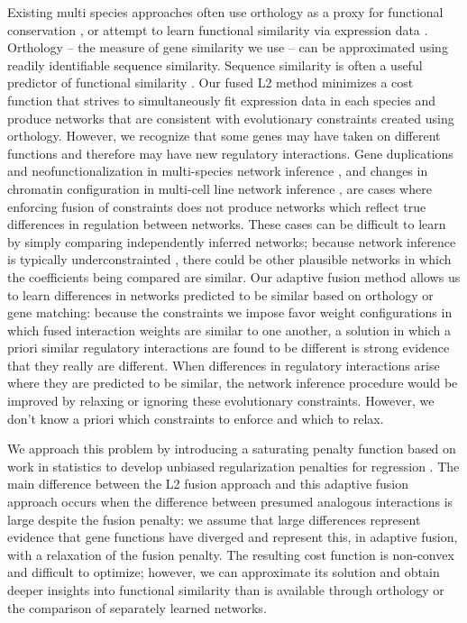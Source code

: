 \documentclass[11pt]{article}
\begin{document}
Existing multi species approaches often use orthology as a proxy for functional conservation \cite{penfold_inferring_2015, joshi_multi-species_2015, kashima_simultaneous_2009, zhang2010nearly}, or attempt to learn functional similarity via expression data \cite{gholami_cross-species_2010}. Orthology -- the measure of gene similarity we use -- can be approximated using readily identifiable sequence similarity. Sequence similarity is often a useful predictor of functional similarity \cite{wilson_assessing_2000}. Our fused L2 method minimizes a cost function that strives to simultaneously fit expression data in each species and produce networks that are consistent with evolutionary constraints created using orthology. However, we recognize that some genes may have taken on different functions and therefore may have new regulatory interactions. Gene duplications and neofunctionalization in multi-species network inference \cite{eisen_phylogenomics:_1998}, and changes in chromatin configuration in multi-cell line network inference \cite{li_role_2007}, are cases where enforcing fusion of constraints does not produce networks which reflect true differences in regulation between networks. These cases can be difficult to learn by simply comparing independently inferred networks; because network inference is typically underconstrainted \cite{marbach_revealing_2010-1}, there could be other plausible networks in which the coefficients being compared are similar. Our adaptive fusion method allows us to learn differences in networks predicted to be similar based on orthology or gene matching: because the constraints we impose favor weight configurations in which fused interaction weights are similar to one another, a solution in which a priori similar regulatory interactions are found to be different is strong evidence that they really are different. When differences in regulatory interactions arise where they are predicted to be similar, the network inference procedure would be improved by relaxing or ignoring these evolutionary constraints. However, we don't know a priori which constraints to enforce and which to relax. 


We approach this problem by introducing a saturating penalty function based on work in statistics to develop unbiased regularization penalties for regression \cite{zhang2010nearly, fan2001variable}. The main difference between the L2 fusion approach and this adaptive fusion approach occurs when the difference between presumed analogous interactions is large despite the fusion penalty: we assume that large differences represent evidence that gene functions have diverged and represent this, in adaptive fusion, with a relaxation of the fusion penalty. The resulting cost function is non-convex and difficult to optimize; however, we can approximate its solution and obtain deeper insights into functional similarity than is available through orthology or the comparison of separately learned networks. 
\end{document}
